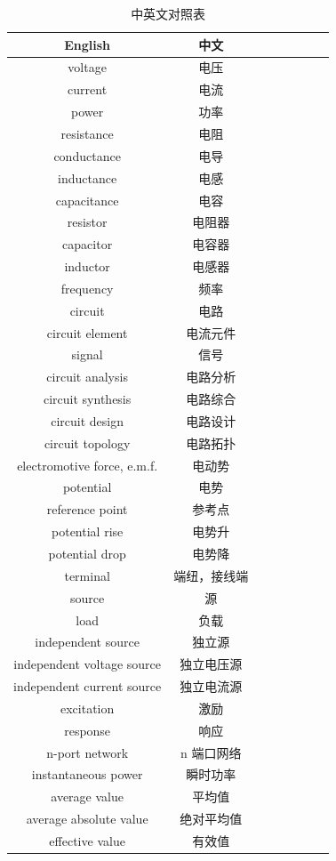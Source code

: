 \documentclass[UTF8]{report}
\theoremstyle{MyLineTheoremStyle} %
\theoremstyle{MyBlockTheoremStyle} %
\theoremstyle{MySubsubsectionStyle} %
\begin{document}
\begin{multicols}{2}  
\begin{table}[H]\centering
\caption{中英文对照表}
\begin{tabular}{cccccccc}\toprule
    English & 中文 \\
    \midrule
    voltage            & 电压 \\
    current            & 电流 \\
    power              & 功率 \\
    resistance         & 电阻 \\
    conductance        & 电导 \\
    inductance         & 电感 \\
    capacitance        & 电容 \\
    resistor           & 电阻器 \\
    capacitor          & 电容器 \\
    inductor           & 电感器 \\
    frequency          & 频率 \\
    circuit            & 电路 \\
    circuit element    & 电流元件 \\
    signal             & 信号 \\
    circuit analysis   & 电路分析 \\
    circuit synthesis  & 电路综合 \\
    circuit design     & 电路设计 \\
    circuit topology   & 电路拓扑 \\
    electromotive force, e.m.f. & 电动势 \\
    potential & 电势 \\
    reference point & 参考点 \\
    potential rise & 电势升 \\
    potential drop & 电势降 \\
    terminal & 端纽，接线端\\ 
    source & 源 \\
    load & 负载 \\
    independent source & 独立源 \\ 
    independent voltage source & 独立电压源 \\ 
    independent current source & 独立电流源 \\ 
    excitation & 激励 \\
    response & 响应 \\
    n-port network & n 端口网络 \\
    instantaneous power & 瞬时功率 \\
    average value & 平均值 \\
    average absolute value & 绝对平均值 \\
    effective value & 有效值 \\
    \bottomrule
\end{tabular}
\end{table}


\end{multicols}
\end{document}
